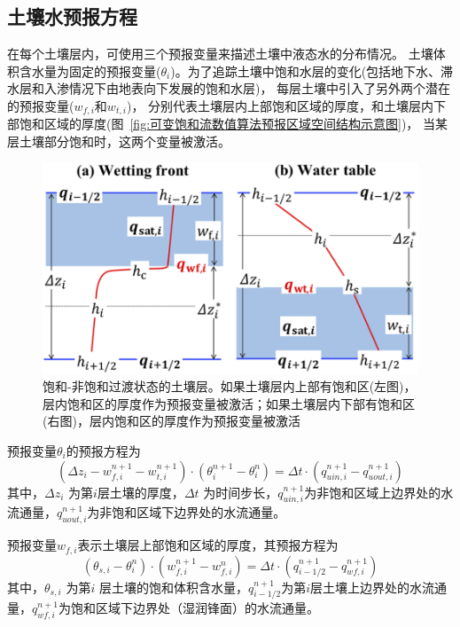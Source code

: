 \subsection{土壤水预报方程}
在每个土壤层内，可使用三个预报变量来描述土壤中液态水的分布情况。
土壤体积含水量为固定的预报变量($\theta_i$)。为了追踪土壤中饱和水层的变化(包括地下水、滞水层和入渗情况下由地表向下发展的饱和水层)，
每层土壤中引入了另外两个潜在的预报变量($w_{f,i}$和$w_{t,i}$)，
分别代表土壤层内上部饱和区域的厚度，和土壤层内下部饱和区域的厚度(图~\ref{fig:可变饱和流数值算法预报区域空间结构示意图})，
当某层土壤部分饱和时，这两个变量被激活。
{
\begin{figure}[htbp]
\centering
\includegraphics{Figures/陆地表面的水分循环/饱和-非饱和过渡状态的土壤层.png}
\caption[饱和-非饱和过渡状态的土壤层]{饱和-非饱和过渡状态的土壤层。如果土壤层内上部有饱和区(左图)，
层内饱和区的厚度作为预报变量被激活；如果土壤层内下部有饱和区(右图)，层内饱和区的厚度作为预报变量被激活}
\label{fig:饱和-非饱和过渡状态的土壤层}
\end{figure}
}

预报变量$\theta_i$的预报方程为
\begin{equation}\label{si_in1}
\left(\Delta z_{i}-w_{f, i}^{n+1}-w_{t, i}^{n+1}\right) \cdot\left(\theta_{i}^{n+1}-\theta_{i}^{n}\right)=\Delta t \cdot\left(q_{ {uin,i }}^{n+1}-q_{uout,i}^{n+1}\right)
\end{equation}
其中，$\Delta z_i$ 为第$ i $层土壤的厚度，$\Delta t$ 为时间步长，$q_{uin,i}^{n+1}$为非饱和区域上边界处的水流通量，$q_{uout,i}^{n+1}$为非饱和区域下边界处的水流通量。


预报变量$w_{f,i}$表示土壤层上部饱和区域的厚度，其预报方程为
\begin{equation}\label{si_in2}
\left(\theta_{s, i}-\theta_{i}^{n}\right) \cdot\left(w_{f, i}^{n+1}-w_{f, i}^{n}\right)=\Delta t \cdot\left(q_{i-1/2}^{n+1}-q_{w f, i}^{n+1}\right)
\end{equation}
其中，$\theta_{s,i}$ 为第$ i$ 层土壤的饱和体积含水量，$ q_{{i-1/2}}^{n+1}$为第$i$层土壤上边界处的水流通量，$q_{wf,i}^{n+1}$为饱和区域下边界处（湿润锋面）的水流通量。


